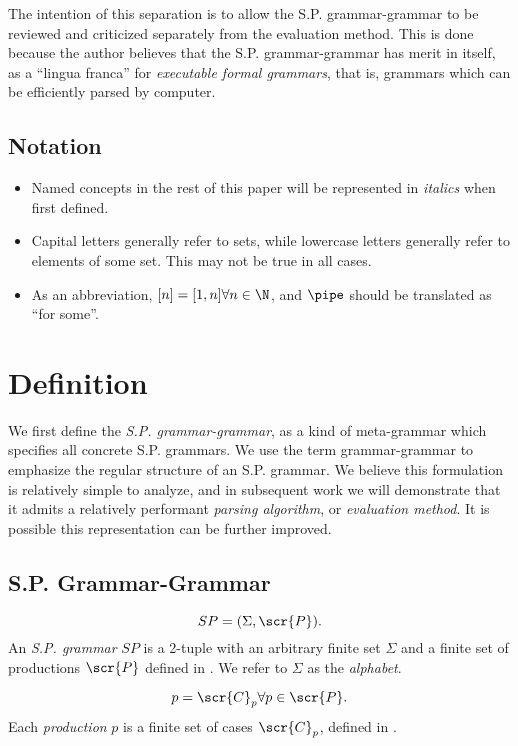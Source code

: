 \documentclass[10pt]{article}
\begin{document}
The intention of this separation is to allow the S.P. grammar-grammar to be reviewed and criticized separately from the evaluation method. This is done because the author believes that the S.P. grammar-grammar has merit in itself, as a ``lingua franca'' for \textit{executable formal grammars}, that is, grammars which can be efficiently parsed by computer.

\subsection{Notation}
\label{sec:notation}
\begin{itemize}
  \item Named concepts in the rest of this paper will be represented in \textit{italics} when first defined.
  \item Capital letters generally refer to sets, while lowercase letters generally refer to elements of some set. This may not be true in all cases.
  \item As an abbreviation, $[n] = [1, n] \forall n \in \N$, and $\pipe$ should be translated as ``for some''.
\end{itemize}

\section{Definition}
\label{sec:definition}
We first define the \textit{S.P. grammar-grammar}, as a kind of meta-grammar which specifies all concrete S.P. grammars. We use the term grammar-grammar to emphasize the regular structure of an S.P. grammar. We believe this formulation is relatively simple to analyze, and in subsequent work we will demonstrate that it admits a relatively performant \textit{parsing algorithm}, or \textit{evaluation method}. It is possible this representation can be further improved.

\subsection{S.P. Grammar-Grammar}
\label{sec:grammar-grammar}
\begin{equation}
  \label{eq:sp}
  SP = (\Sigma, \scr{P}).
\end{equation}
An \textit{S.P. grammar} $SP$ is a 2-tuple with an arbitrary finite set $\Sigma$ and a finite set of productions $\scr{P}$ defined in . We refer to $\Sigma$ as the \textit{alphabet}.

\begin{equation}
  \label{eq:p}
  p = \scr{C}_p \forall p \in \scr{P}.
\end{equation}
Each \textit{production} $p$ is a finite set of cases $\scr{C}_p$, defined in .
\end{document}
